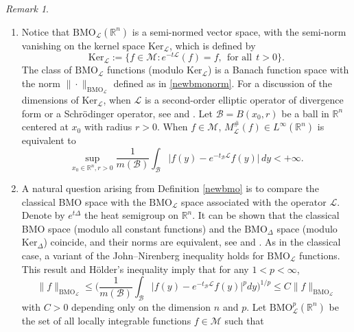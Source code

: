 \documentclass[10pt, reqno]{amsart}
\theoremstyle{definition}
\theoremstyle{remark}
\newtheorem{remark}[theorem]{Remark}
\numberwithin{equation}{section}
\begin{document}
\begin{remark}
\begin{enumerate}
Let us now list some important properties of the space $\mathrm{BMO}_{\mathcal{L}}(\mathbb R^n)$.
\item Notice that $\mathrm{BMO}_{\mathcal{L}}(\mathbb R^n)$ is a semi-normed vector space, with the semi-norm vanishing on the kernel space $\mathrm{Ker}_{\mathcal{L}}$, which is defined by
\begin{equation*}
\mathrm{Ker}_{\mathcal{L}}:=\Big\{f\in \mathcal{M}:e^{-t\mathcal{L}}(f)=f,~~\mbox{for all}~~ t>0\Big\}.
\end{equation*}
The class of $\mathrm{BMO}_{\mathcal{L}}$ functions (modulo $\mathrm{Ker}_{\mathcal{L}}$) is a Banach function space with the norm $\|\cdot\|_{\mathrm{BMO}_{\mathcal{L}}}$ defined as in \eqref{newbmonorm}. For a discussion of the dimensions of $\mathrm{Ker}_{\mathcal{L}}$, when $\mathcal{L}$ is a second-order elliptic operator of divergence form or a Schr\"{o}dinger operator, see \cite{duong2} and \cite{duong3}. Let $\mathcal{B}=B(x_0,r)$ be a ball in $\mathbb R^n$ centered at $x_0$ with radius $r>0$. When $f\in \mathcal{M}$, $M^{\#}_{\mathcal{L}}(f)\in L^{\infty}(\mathbb R^n)$ is equivalent to
\begin{equation*}
\sup_{x_0\in\mathbb R^n,r>0}\frac{1}{m(\mathcal{B})}\int_{\mathcal{B}}\big|f(y)-e^{-t_{\mathcal{B}}\mathcal{L}}f(y)\big|\,dy<+\infty.
\end{equation*}
\item A natural question arising from Definition \ref{newbmo} is to compare the classical BMO space with the $\mathrm{BMO}_{\mathcal{L}}$ space associated with the operator $\mathcal{L}$. Denote by $e^{t\Delta}$ the heat semigroup on $\mathbb R^n$. It can be shown that the classical BMO space (modulo all constant functions) and the $\mathrm{BMO}_{\Delta}$ space (modulo $\mathrm{Ker}_{\Delta}$) coincide, and their norms are equivalent, see \cite{duong2} and \cite{duong3}. As in the classical case, a variant of the John--Nirenberg inequality holds for $\mathrm{BMO}_{\mathcal{L}}$ functions. This result and H\"{o}lder's inequality imply that for any $1<p<\infty$,
\begin{equation*}
\big\|f\big\|_{\mathrm{BMO}_{\mathcal{L}}}
\leq\bigg(\frac{1}{m(\mathcal{B})}\int_{\mathcal{B}}\big|f(y)-e^{-t_{\mathcal{B}}\mathcal{L}}f(y)\big|^pdy\bigg)^{1/p}
\leq C\big\|f\big\|_{\mathrm{BMO}_{\mathcal{L}}}
\end{equation*}
with $C>0$ depending only on the dimension $n$ and $p$. Let $\mathrm{BMO}^p_{\mathcal{L}}(\mathbb R^n)$ be the set of all locally integrable functions $f\in \mathcal{M}$ such that

\end{enumerate}
\end{remark}
\end{document}
